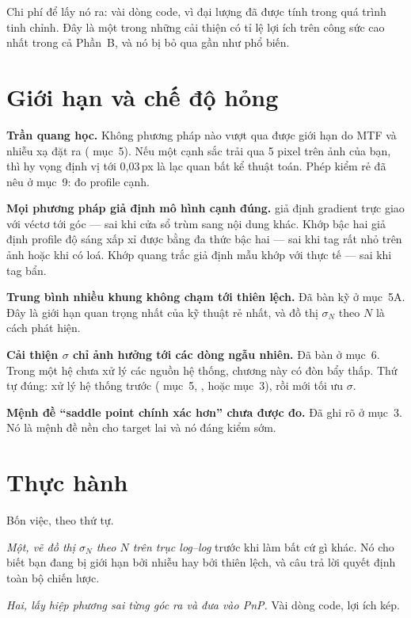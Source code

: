 \documentclass[../../marker.tex]{subfiles}
\begin{document}
Chi phí để lấy nó ra: vài dòng code, vì đại lượng đã được tính trong quá trình tinh chỉnh. Đây là một trong những cải thiện có tỉ lệ lợi ích trên công sức cao nhất trong cả Phần~B, và nó bị bỏ qua gần như phổ biến.

\section{Giới hạn và chế độ hỏng}

\textbf{Trần quang học.} Không phương pháp nào vượt qua được giới hạn do MTF và nhiễu xạ đặt ra ( mục~5). Nếu một cạnh sắc trải qua 5 pixel trên ảnh của bạn, thì hy vọng định vị tới 0,03\,px là lạc quan bất kể thuật toán. Phép kiểm rẻ đã nêu ở  mục~9: đo profile cạnh.

\textbf{Mọi phương pháp giả định mô hình cạnh đúng.}  giả định gradient trực giao với véctơ tới góc --- sai khi cửa sổ trùm sang nội dung khác. Khớp bậc hai giả định profile độ sáng xấp xỉ được bằng đa thức bậc hai --- sai khi tag rất nhỏ trên ảnh hoặc khi có loá. Khớp quang trắc giả định mẫu khớp với thực tế --- sai khi tag bẩn.

\textbf{Trung bình nhiều khung không chạm tới thiên lệch.} Đã bàn kỹ ở mục~5A. Đây là giới hạn quan trọng nhất của kỹ thuật rẻ nhất, và đồ thị \(\sigma_N\) theo \(N\) là cách phát hiện.

\textbf{Cải thiện \(\sigma\) chỉ ảnh hưởng tới các dòng ngẫu nhiên.} Đã bàn ở mục~6. Trong một hệ chưa xử lý các nguồn hệ thống, chương này có đòn bẩy thấp. Thứ tự đúng: xử lý hệ thống trước ( mục~5, , hoặc  mục~3), rồi mới tối ưu \(\sigma\).

\textbf{Mệnh đề ``saddle point chính xác hơn'' chưa được đo.} Đã ghi rõ ở mục~3. Nó là mệnh đề nền cho target lai và nó đáng kiểm sớm.

\section{Thực hành}

Bốn việc, theo thứ tự.

\emph{Một, vẽ đồ thị \(\sigma_N\) theo \(N\) trên trục log--log} trước khi làm bất cứ gì khác. Nó cho biết bạn đang bị giới hạn bởi nhiễu hay bởi thiên lệch, và câu trả lời quyết định toàn bộ chiến lược.

\emph{Hai, lấy hiệp phương sai từng góc ra và đưa vào PnP.} Vài dòng code, lợi ích kép.
\end{document}
